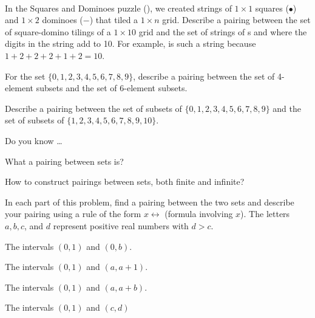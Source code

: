 \begin{exer}[\exerU] %
\label{exer_pairing_discrete_objects}
~
    \begin{apart}
        \item In the Squares and Dominoes puzzle (), we created strings of $1 \times 1$ squares ($\bullet$) and $1 \times 2$ dominoes ($\boldsymbol{-}$) that tiled a $1 \times n$ grid.  Describe a pairing between the set of square-domino tilings of a $1 \times 10$ grid and the set of strings of s and  where the digits in the string add to 10.  For example,  is such a string because $1+2+2+2+1+2=10$.
        \item For the set $\{0,1,2,3,4,5,6,7,8,9\}$, describe a pairing between the set of 4-element subsets and the set of 6-element subsets.
        \item Describe a pairing between the set of subsets of $\{0,1,2,3,4,5,6,7,8,9\}$ and the set of subsets of $\{1,2,3,4,5,6,7,8,9,10\}$.
    \end{apart}
\end{exer}

\begin{exer}[\exerR] %
\label{exer_dyk_pairings}
    Do you know \ldots
        \begin{exerpart}
            \item What a pairing between sets is?
            \item How to construct pairings between sets, both finite and infinite? 
        \end{exerpart}
\end{exer}

\begin{exer}[\exerE] %
\label{exer_any_two_intervals_same_size}
    In each part of this problem, find a pairing between the two sets and describe your pairing using a rule of the form $x \leftrightarrow$ (formula involving $x$).  The letters $a, b,c$, and $d$ represent positive real numbers with $d > c$.
    \begin{apart}
        \item The intervals $(0,1)$ and $(0,b)$.
        \item The intervals $(0,1)$ and $(a,a+1)$.
        \item The intervals $(0,1)$ and $(a,a+b)$.
        \item The intervals $(0,1)$ and $(c,d)$
    \end{apart}
\end{exer}

